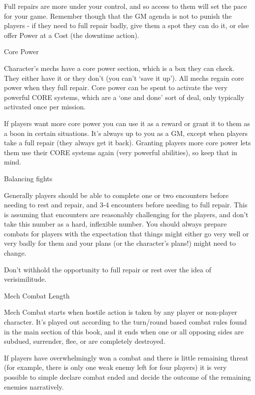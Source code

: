 Full repairs are more under your control, and so access to them will set the pace for your game.
Remember though that the GM agenda is not to punish the players - if they need to full repair
badly, give them a spot they can do it, or else offer Power at a Cost (the downtime action).


                                                Core Power

Character’s mechs have a core power section, which is a box they can check. They either have
it or they don’t (you can’t ‘save it up’). All mechs regain core power when they full repair. Core
power can be spent to activate the very powerful CORE systems, which are a ‘one and done’
sort of deal, only typically activated once per mission.


If players want more core power you can use it as a reward or grant it to them as a boon in
certain situations. It’s always up to you as a GM, except when players take a full repair (they
always get it back). Granting players more core power lets them use their CORE systems again
(very powerful abilities), so keep that in mind.


                                             Balancing fights




Generally players should be able to complete one or two encounters before needing to rest and
repair, and 3-4 encounters before needing to full repair. This is assuming that encounters are
reasonably challenging for the players, and don’t take this number as a hard, inflexible number.
You should always prepare combats for players with the expectation that things might either go
very well or very badly for them and your plans (or the character’s plans!) might need to change.


Don’t withhold the opportunity to full repair or rest over the idea of verisimilitude.


                                          Mech Combat Length

Mech Combat starts when hostile action is taken by any player or non-player character. It’s
played out according to the turn/round based combat rules found in the main section of this
book, and it ends when one or all opposing sides are subdued, surrender, flee, or are completely
destroyed.


If players have overwhelmingly won a combat and there is little remaining threat (for example,
there is only one weak enemy left for four players) it is very possible to simple declare combat
ended and decide the outcome of the remaining enemies narratively.



